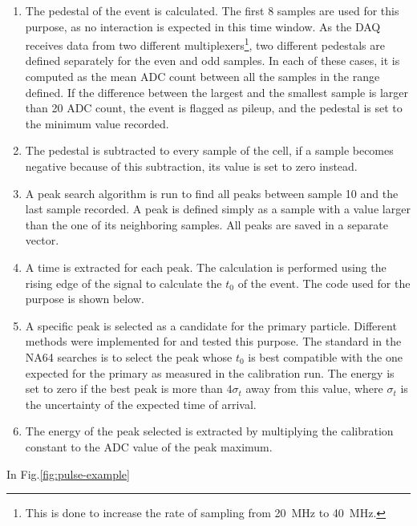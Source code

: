 \begin{enumerate}
\item The pedestal of the event is calculated. The first 8 samples are used for this purpose, as no interaction is expected in this time window. As the DAQ receives data from two different multiplexers\footnote{This is done to increase the rate of sampling from \SI{20}{\mega\hertz} to \SI{40}{\mega\hertz}.}, two different pedestals are defined separately for the even and odd samples. In each of these cases, it is computed as the mean ADC count between all the samples in the range defined. If the difference between the largest and the smallest sample is larger than 20 ADC count, the event is flagged as pileup, and the pedestal is set to the minimum value recorded.
\item The pedestal is subtracted to every sample of the cell, if a sample becomes negative because of this subtraction, its value is set to zero instead.
\item A peak search algorithm is run to find all peaks between sample 10 and the last sample recorded. A peak is defined simply as a sample with a value larger than the one of its neighboring samples. All peaks are saved in a separate vector.
\item A time is extracted for each peak. The calculation is performed using the rising edge of the signal to calculate the $t_0$ of the event. The code used for the purpose is shown below.
\item A specific peak is selected as a candidate for the primary particle. Different methods were implemented for and tested this purpose. The standard in the NA64 searches is to select the peak whose $t_0$ is best compatible with the one expected for the primary as measured in the calibration run. The energy is set to zero if the best peak is more than $4\sigma_t$ away from this value, where $\sigma_t$ is the uncertainty of the expected time of arrival.
\item The energy of the peak selected is extracted by multiplying the calibration constant to the ADC value of the peak maximum.
\end{enumerate}

In Fig.\ref{fig:pulse-example}

